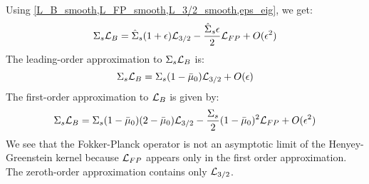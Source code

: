 Using \cref{L_B_smooth,L_FP_smooth,L_3/2_smooth,eps_eig}, we get:
\begin{equation}
\Sigma_s\mc{L}_B = \hat{\Sigma}_s(1+\epsilon) \mc{L}_{3/2} -
\frac{\hat{\Sigma}_s \epsilon}{2} \mc{L}_{FP} + O(\epsilon^2)
\label{HG_approx}
\end{equation}
The leading-order approximation to $\Sigma_s \mathcal{L}_B$ is:
\begin{equation}
\Sigma_s \mathcal{L}_B = \Sigma_s(1-\bar{\mu}_0) \mathcal{L}_{3/2} +O(\epsilon)
\end{equation}
The first-order approximation to $\mathcal{L}_B$ is given by:
\begin{equation}
\Sigma_s\mathcal{L}_B = \Sigma_s(1-\bar{\mu}_0)(2-\bar{\mu}_0) \mathcal{L}_{3/2} -
\frac{\Sigma_s}{2}(1-\bar{\mu}_0)^2\mathcal{L}_{FP} + O(\epsilon^2)
\end{equation}
We see that the Fokker-Planck operator is not an asymptotic limit of the
Henyey-Greenstein kernel because $\mathcal{L}_{FP}$ appears only in the first order
approximation. The zeroth-order approximation contains only $\mathcal{L}_{3/2}$.

